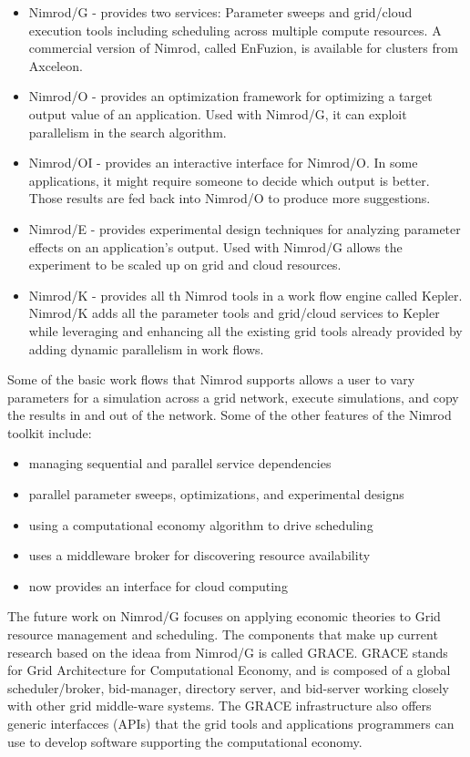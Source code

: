 \documentclass[conference]{IEEEtran}
\begin{document}
\begin{itemize}
\item Nimrod/G - provides two services: Parameter sweeps and grid/cloud execution tools including scheduling across multiple compute resources. A commercial version of Nimrod, called EnFuzion, is available for clusters from Axceleon.
\item Nimrod/O - provides an optimization framework for optimizing a target output value of an application. Used with Nimrod/G, it can exploit parallelism in the search algorithm. 
\item Nimrod/OI - provides an interactive interface for Nimrod/O. In some applications, it might require someone to decide which output is better. Those results are fed back into Nimrod/O to produce more suggestions. 
\item Nimrod/E - provides experimental design techniques for analyzing parameter effects on an application's output. Used with Nimrod/G allows the experiment to be scaled up on grid and cloud resources.
\item Nimrod/K - provides all th Nimrod tools in a work flow engine called Kepler. Nimrod/K adds all the parameter tools and grid/cloud services to Kepler while leveraging and enhancing all the existing grid tools already provided by adding dynamic parallelism in work flows. 
\end{itemize}

Some of the basic work flows that Nimrod supports allows a user to vary parameters for a simulation across a grid network, execute simulations, and copy the results in and out of the network. Some of the other features of the Nimrod toolkit include:
\begin{itemize}
\item managing sequential and parallel service dependencies
\item parallel parameter sweeps, optimizations, and experimental designs
\item using a computational economy algorithm to drive scheduling
\item uses a middleware broker for discovering resource availability
\item now provides an interface for cloud computing
\end{itemize}

The future work on Nimrod/G focuses on applying economic theories to Grid resource management and scheduling. The components that make up current research based on the ideaa from Nimrod/G is called GRACE. GRACE stands for Grid Architecture for Computational Economy, and is composed of a global scheduler/broker, bid-manager, directory server, and bid-server working closely with other grid middle-ware systems. The GRACE infrastructure also offers generic interfacces (APIs) that the grid tools and applications programmers can use to develop software supporting the computational economy.
\end{document}
